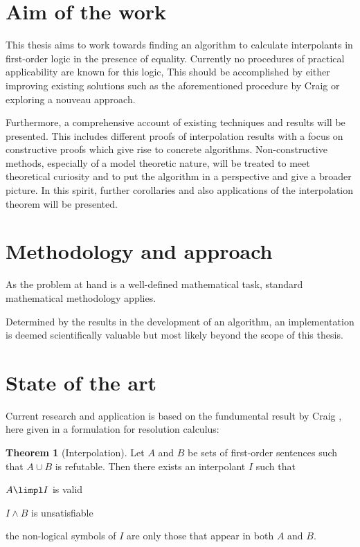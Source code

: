 \documentclass[,%
			paper=a4,%
			DIV12,
			liststotoc,
			bibtotoc,
			draft=false,%
			numbers=noendperiod
			]{scrartcl}
\theoremstyle{definition}
\newtheorem{thm}{Theorem}
\begin{document}
\section{Aim of the work}

This thesis aims to work towards finding an algorithm to calculate interpolants in first-order logic in the presence of equality.
Currently no procedures of practical applicability are known for this logic,  
This should be accomplished by either improving existing solutions such as the aforementioned procedure by Craig or exploring a nouveau approach.

Furthermore, a comprehensive account of existing techniques and results will be presented.
This includes different proofs of interpolation results with a focus on constructive proofs which give rise to concrete algorithms.
Non-constructive methods, especially of a model theoretic nature, will be treated to meet theoretical curiosity and to put the algorithm in a perspective and give a broader picture.
In this spirit, further corollaries and also applications of the interpolation theorem will be presented.


\section{Methodology and approach}

As the problem at hand is a well-defined mathematical task, standard mathematical methodology applies.

Determined by the results in the development of an algorithm, an implementation is deemed scientifically valuable but most likely beyond the scope of this thesis.


\section{State of the art}

Current research and application is based on the fundumental result by Craig \cite{craig57linear}, here given in a formulation for resolution calculus:

\begin{thm}[Interpolation]
	Let $A$ and $B$ be sets of first-order sentences such that $A \cup B$ is refutable. 
	Then there exists an interpolant $I$ such that
	\begin{compactenum}
		\item $A \limpl I$ is valid 
		\item $I \land B$ is unsatisfiable
		\item the non-logical symbols of $I$ are only those that appear in both $A$ and $B$.
	\end{compactenum}
\end{thm}
\end{document}
